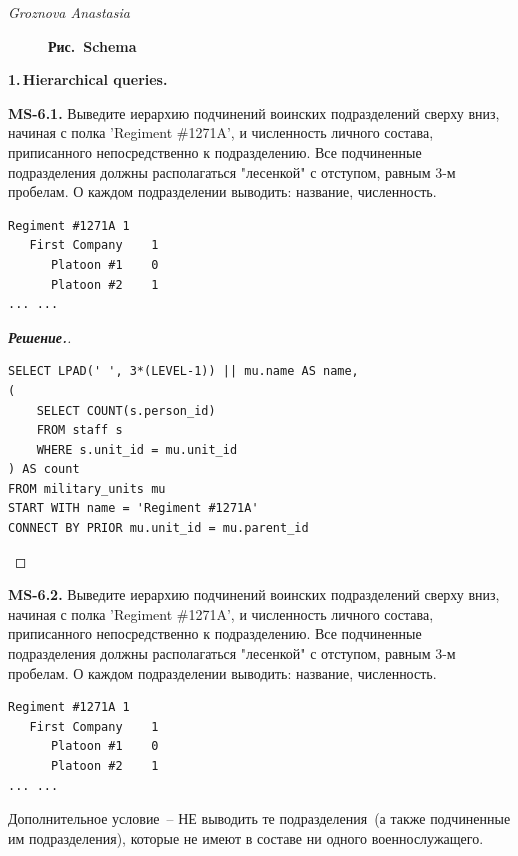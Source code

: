 \documentclass[a4paper]{article}
\newcommand{\MYlvm}{\leavevmode\vspace{-0.3cm}}		%
\begin{document}
\begin{flushright}
{\it Groznova Anastasia}
\end{flushright}


\begin{figure}[h]
\noindent{}
\caption*{{\bf Рис.~Schema}}
\end{figure}


\noindent
{\large\bf 1.\,Hierarchical queries.}

\vspace{.5cm}
\noindent
{\bf MS-6.1.}
Выведите иерархию подчинений воинских подразделений сверху вниз, начиная с полка 
'Regiment \#1271A', и численность личного состава, приписанного непосредственно к
подразделению. Все подчиненные подразделения должны располагаться "лесенкой" с 
отступом, равным 3-м пробелам. 
О каждом подразделении выводить: название, численность.
\begin{lstlisting}
Regiment #1271A	1
   First Company	1
      Platoon #1	0
      Platoon #2	1
...	...
\end{lstlisting}

\begin{proof}[{\bf Решение.}]\MYlvm\\
\begin{lstlisting} 
SELECT LPAD(' ', 3*(LEVEL-1)) || mu.name AS name, 
( 
    SELECT COUNT(s.person_id) 
    FROM staff s  
    WHERE s.unit_id = mu.unit_id 
) AS count
FROM military_units mu
START WITH name = 'Regiment #1271A'
CONNECT BY PRIOR mu.unit_id = mu.parent_id
\end{lstlisting}
\end{proof}


\noindent
{\bf MS-6.2.}
Выведите иерархию подчинений воинских подразделений сверху вниз, начиная с полка 
'Regiment \#1271A', и численность личного состава, приписанного непосредственно к
подразделению. Все подчиненные подразделения должны располагаться "лесенкой" с 
отступом, равным 3-м пробелам. 
О каждом подразделении выводить: название, численность.
\begin{lstlisting}
Regiment #1271A	1
   First Company	1
      Platoon #1	0
      Platoon #2	1
...	...
\end{lstlisting}
Дополнительное условие~-- НЕ выводить те подразделения~(а также подчиненные им 
подразделения), которые не имеют в составе ни одного военнослужащего.
\end{document}

